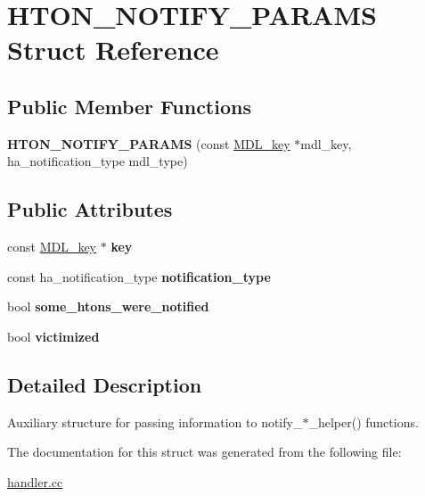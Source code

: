 \hypertarget{structHTON__NOTIFY__PARAMS}{}\section{H\+T\+O\+N\+\_\+\+N\+O\+T\+I\+F\+Y\+\_\+\+P\+A\+R\+A\+MS Struct Reference}
\label{structHTON__NOTIFY__PARAMS}
\subsection*{Public Member Functions}
\begin{DoxyCompactItemize}
\item 
\mbox{\label{structHTON__NOTIFY__PARAMS_a5e0c541562c96365e6fa139e79575276}} 
{\bfseries H\+T\+O\+N\+\_\+\+N\+O\+T\+I\+F\+Y\+\_\+\+P\+A\+R\+A\+MS} (const \mbox{\hyperlink{structMDL__key}{M\+D\+L\+\_\+key}} $\ast$mdl\+\_\+key, ha\+\_\+notification\+\_\+type mdl\+\_\+type)
\end{DoxyCompactItemize}
\subsection*{Public Attributes}
\begin{DoxyCompactItemize}
\item 
\mbox{\label{structHTON__NOTIFY__PARAMS_a80d3437404cfbc9b181cfc2ad45a4760}} 
const \mbox{\hyperlink{structMDL__key}{M\+D\+L\+\_\+key}} $\ast$ {\bfseries key}
\item 
\mbox{\label{structHTON__NOTIFY__PARAMS_a1ab9f65053618eadaca791e8a60fb94d}} 
const ha\+\_\+notification\+\_\+type {\bfseries notification\+\_\+type}
\item 
\mbox{\label{structHTON__NOTIFY__PARAMS_aa6d28bad77fb72f1b79312871e403ef8}} 
bool {\bfseries some\+\_\+htons\+\_\+were\+\_\+notified}
\item 
\mbox{\label{structHTON__NOTIFY__PARAMS_a45869ea0daf34760e23a4073b0f08384}} 
bool {\bfseries victimized}
\end{DoxyCompactItemize}


\subsection{Detailed Description}
Auxiliary structure for passing information to notify\+\_\+$\ast$\+\_\+helper() functions. 

The documentation for this struct was generated from the following file\+:\begin{DoxyCompactItemize}
\item 
\mbox{\hyperlink{handler_8cc}{handler.\+cc}}\end{DoxyCompactItemize}
